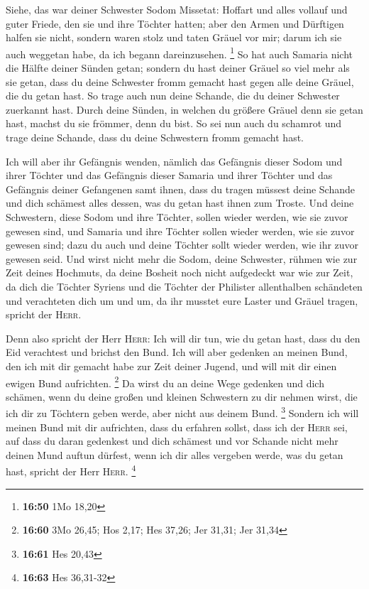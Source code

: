  Siehe, das war deiner Schwester Sodom Missetat: Hoffart
und alles vollauf und guter Friede, den sie und ihre Töchter hatten;
aber den Armen und Dürftigen halfen sie nicht,  sondern
waren stolz und taten Gräuel vor mir; darum ich sie auch weggetan habe,
da ich begann dareinzusehen. \footnote{\textbf{16:50} 1Mo 18,20}
 So hat auch Samaria nicht die Hälfte deiner Sünden
getan; sondern du hast deiner Gräuel so viel mehr als sie getan, dass du
deine Schwester fromm gemacht hast gegen alle deine Gräuel, die du getan
hast.  So trage auch nun deine Schande, die du deiner
Schwester zuerkannt hast. Durch deine Sünden, in welchen du größere
Gräuel denn sie getan hast, machst du sie frömmer, denn du bist. So sei
nun auch du schamrot und trage deine Schande, dass du deine Schwestern
fromm gemacht hast.

 Ich will aber ihr Gefängnis wenden, nämlich das
Gefängnis dieser Sodom und ihrer Töchter und das Gefängnis dieser
Samaria und ihrer Töchter und das Gefängnis deiner Gefangenen samt
ihnen,  dass du tragen müssest deine Schande und dich
schämest alles dessen, was du getan hast ihnen zum Troste.
 Und deine Schwestern, diese Sodom und ihre Töchter,
sollen wieder werden, wie sie zuvor gewesen sind, und Samaria und ihre
Töchter sollen wieder werden, wie sie zuvor gewesen sind; dazu du auch
und deine Töchter sollt wieder werden, wie ihr zuvor gewesen seid.
 Und wirst nicht mehr die Sodom, deine Schwester, rühmen
wie zur Zeit deines Hochmuts,  da deine Bosheit noch
nicht aufgedeckt war wie zur Zeit, da dich die Töchter Syriens und die
Töchter der Philister allenthalben schändeten und verachteten dich um
und um,  da ihr musstet eure Laster und Gräuel tragen,
spricht der \textsc{Herr}.

 Denn also spricht der Herr \textsc{Herr}: Ich will dir
tun, wie du getan hast, dass du den Eid verachtest und brichst den Bund.
 Ich will aber gedenken an meinen Bund, den ich mit dir
gemacht habe zur Zeit deiner Jugend, und will mit dir einen ewigen Bund
aufrichten. \footnote{\textbf{16:60} 3Mo 26,45; Hos 2,17; Hes 37,26; Jer
  31,31; Jer 31,34}  Da wirst du an deine Wege gedenken
und dich schämen, wenn du deine großen und kleinen Schwestern zu dir
nehmen wirst, die ich dir zu Töchtern geben werde, aber nicht aus deinem
Bund. \footnote{\textbf{16:61} Hes 20,43}  Sondern ich
will meinen Bund mit dir aufrichten, dass du erfahren sollst, dass ich
der \textsc{Herr} sei,  auf dass du daran gedenkest und
dich schämest und vor Schande nicht mehr deinen Mund auftun dürfest,
wenn ich dir alles vergeben werde, was du getan hast, spricht der Herr
\textsc{Herr}. \footnote{\textbf{16:63} Hes 36,31-32}

